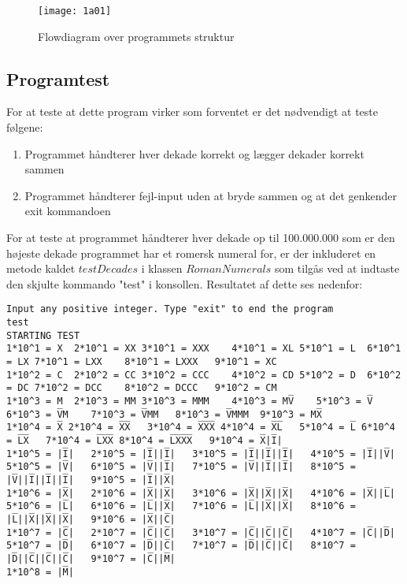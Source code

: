 	\begin{figure}[h!]
	  \centering
	      \texttt{[image: 1a01]}
	  \caption{Flowdiagram over programmets struktur}\label{fig:1a01}
	\end{figure}
		 
	



\subsection{Programtest}
	For at teste at dette program virker som forventet er det nødvendigt at teste følgene:
 	\begin{enumerate}
 		\item Programmet håndterer hver dekade korrekt og lægger dekader korrekt sammen
 		\item Programmet håndterer fejl-input uden at bryde sammen og at det genkender exit kommandoen
 	\end{enumerate}
 	For at teste at programmet håndterer hver dekade op til 100.000.000 som er den højeste dekade programmet har et romersk numeral for, er der inkluderet en metode kaldet $testDecades$ i klassen $RomanNumerals$ som tilgås ved at indtaste den skjulte kommando "test" i konsollen. Resultatet af dette ses nedenfor:
	\begin{lstlisting}[caption=output fra kørsel af testDecades]
Input any positive integer. Type "exit" to end the program
test
STARTING TEST
1*10^1 = X	2*10^1 = XX	3*10^1 = XXX	4*10^1 = XL	5*10^1 = L	6*10^1 = LX	7*10^1 = LXX	8*10^1 = LXXX	9*10^1 = XC	
1*10^2 = C	2*10^2 = CC	3*10^2 = CCC	4*10^2 = CD	5*10^2 = D	6*10^2 = DC	7*10^2 = DCC	8*10^2 = DCCC	9*10^2 = CM	
1*10^3 = M	2*10^3 = MM	3*10^3 = MMM	4*10^3 = MV̅	5*10^3 = V̅	6*10^3 = V̅M	7*10^3 = V̅MM	8*10^3 = V̅MMM	9*10^3 = MX̅	
1*10^4 = X̅	2*10^4 = X̅X̅	3*10^4 = X̅X̅X̅	4*10^4 = X̅L̅	5*10^4 = L̅	6*10^4 = L̅X̅	7*10^4 = L̅X̅X̅	8*10^4 = L̅X̅X̅X̅	9*10^4 = X̅|I̅|	
1*10^5 = |I̅|	2*10^5 = |I̅||I̅|	3*10^5 = |I̅||I̅||I̅|	4*10^5 = |I̅||V̅|	5*10^5 = |V̅|	6*10^5 = |V̅||I̅|	7*10^5 = |V̅||I̅||I̅|	8*10^5 = |V̅||I̅||I̅||I̅|	9*10^5 = |I̅||X̅|	
1*10^6 = |X̅|	2*10^6 = |X̅||X̅|	3*10^6 = |X̅||X̅||X̅|	4*10^6 = |X̅||L̅|	5*10^6 = |L̅|	6*10^6 = |L̅||X̅|	7*10^6 = |L̅||X̅||X̅|	8*10^6 = |L̅||X̅||X̅||X̅|	9*10^6 = |X̅||C̅|	
1*10^7 = |C̅|	2*10^7 = |C̅||C̅|	3*10^7 = |C̅||C̅||C̅|	4*10^7 = |C̅||D̅|	5*10^7 = |D̅|	6*10^7 = |D̅||C̅|	7*10^7 = |D̅||C̅||C̅|	8*10^7 = |D̅||C̅||C̅||C̅|	9*10^7 = |C̅||M̅|	
1*10^8 = |M̅|	  
	\end{lstlisting}
